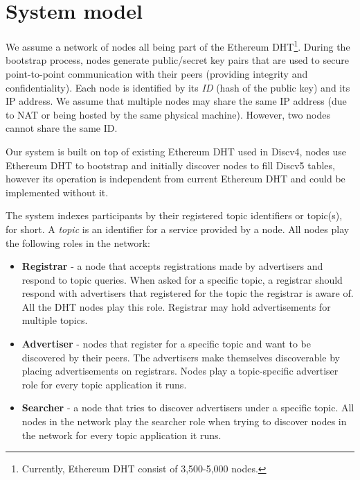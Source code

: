 
\section{System model}
\label{sec:model}

We assume a network of nodes all being part of the Ethereum DHT\footnote{Currently, Ethereum DHT consist of 3,500-5,000 nodes.}. During the bootstrap process, nodes generate public/secret key pairs that are used to secure point-to-point communication with their peers (providing integrity and confidentiality). Each node is identified by its \emph{ID} (hash of the public key) and its IP address. We assume that multiple nodes may share the same IP address (due to NAT or being hosted by the same physical machine). However,  two nodes cannot share the same ID.  

Our system is built on top of existing Ethereum DHT used in Discv4, \ie nodes use Ethereum DHT to bootstrap and initially discover nodes to fill Discv5 tables, however its operation is independent from current Ethereum DHT and could be implemented without it.

The system indexes participants by their registered topic identifiers or topic(s), for short. 
A \emph{topic} is an identifier for a service provided by a node. 
All nodes play the following roles in the network:

\begin{itemize}
    \item \textbf{Registrar} - a node that accepts registrations made by advertisers and respond to topic queries. When asked for a specific topic, a registrar should respond with advertisers that registered for the topic the registrar is aware of. 
All the DHT nodes play this role. 
Registrar may hold advertisements for multiple topics. 
    \item \textbf{Advertiser} - nodes that register for a specific topic and want to be discovered by their peers. The advertisers make themselves discoverable by placing advertisements on registrars. Nodes play a topic-specific advertiser role for every topic application it runs.
    \item \textbf{Searcher} - a node that tries to discover advertisers under a specific topic. 
All nodes in the network play the searcher role when trying to discover nodes in the network for every topic application it runs.
\end{itemize}

